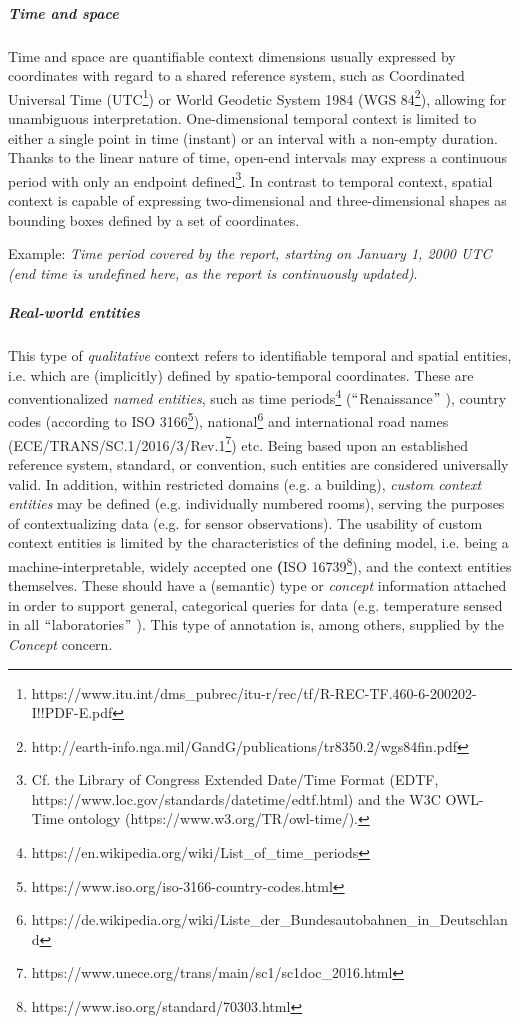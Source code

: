 \subparagraph*{Time and space}
Time and space are quantifiable context dimensions usually expressed by coordinates with regard to a shared reference system, such as Coordinated Universal Time (UTC\footnote{https://www.itu.int/dms\_pubrec/itu-r/rec/tf/R-REC-TF.460-6-200202-I!!PDF-E.pdf }) or World Geodetic System 1984 (WGS 84\footnote{http://earth-info.nga.mil/GandG/publications/tr8350.2/wgs84fin.pdf }), allowing for unambiguous interpretation. One-dimensional temporal context is limited to either a single point in time (instant) or an interval with a non-empty duration. Thanks to the linear nature of time, open-end intervals may express a continuous period with only an endpoint defined\footnote{Cf. the Library of Congress Extended Date/Time Format (EDTF, https://www.loc.gov/standards/datetime/edtf.html) and the W3C OWL-Time ontology (https://www.w3.org/TR/owl-time/). }. In contrast to temporal context, spatial context is capable of expressing two-dimensional and three-dimensional shapes as bounding boxes defined by a set of coordinates. 

Example: \textit{Time period covered by the report, starting on January 1, 2000 UTC (end time is undefined here, as the report is continuously updated)}. 


\subparagraph*{Real-world entities}
This type of \textit{qualitative} context refers to identifiable temporal and spatial entities, i.e. which are (implicitly) defined by spatio-temporal coordinates. These are conventionalized \textit{named entities}, such as time periods\footnote{https://en.wikipedia.org/wiki/List\_of\_time\_periods } ($``$Renaissance$"$ ), country codes (according to ISO 3166\footnote{https://www.iso.org/iso-3166-country-codes.html }), national\footnote{https://de.wikipedia.org/wiki/Liste\_der\_Bundesautobahnen\_in\_Deutschland } and international road names (ECE/TRANS/SC.1/2016/3/Rev.1\footnote{https://www.unece.org/trans/main/sc1/sc1doc\_2016.html }) etc. Being based upon an established reference system, standard, or convention, such entities are considered universally valid. In addition, within restricted domains (e.g. a building), \textit{custom context entities} may be defined (e.g. individually numbered rooms), serving the purposes of contextualizing data (e.g. for sensor observations). The usability of custom context entities is limited by the characteristics of the defining model, i.e. being a machine-interpretable, widely accepted one \textbf{(}ISO 16739\footnote{https://www.iso.org/standard/70303.html }), and the context entities themselves. These should have a (semantic) type or \textit{concept} information attached in order to support general, categorical queries for data (e.g. temperature sensed in all $``$laboratories$"$ ). This type of annotation is, among others, supplied by the \textit{Concept }concern. 

